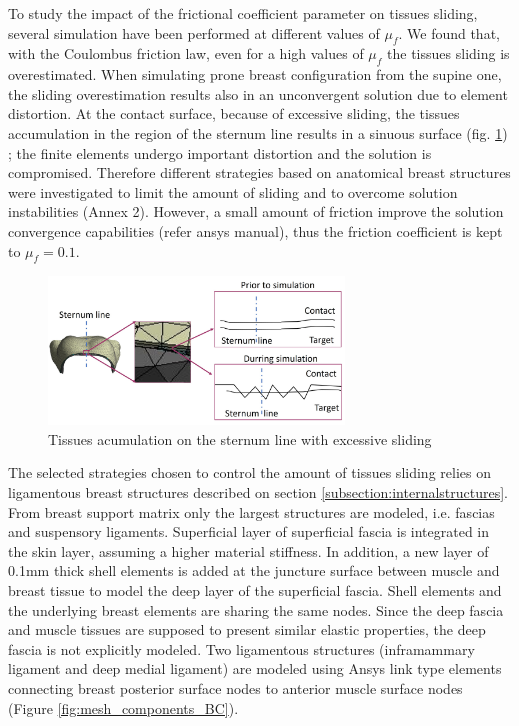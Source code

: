 To study the impact of the frictional coefficient parameter on tissues sliding, several simulation have been performed at different values of $\mu_f$. We found that, with the Coulombus friction law, even for a high values of $\mu_f$ the tissues sliding is overestimated. When simulating prone breast configuration from the supine one, the sliding overestimation results also in an unconvergent solution due to element distortion. At the contact surface, because of excessive sliding, the tissues accumulation in the region of the sternum line results in a sinuous surface  (fig. \ref{fig:overslidingProblem}) ; the finite elements  undergo important distortion and the solution is compromised. Therefore different strategies based on anatomical breast structures were investigated to limit the amount of sliding and to overcome solution instabilities (Annex 2). However, a small amount of friction improve the solution convergence capabilities (refer ansys manual), thus the friction coefficient is kept to $\mu_f = 0.1$. 
\begin{figure}[!h]
\centering
\includegraphics[width=0.7\textwidth,keepaspectratio]{figures/overslidingProblem.jpg} 
\caption{Tissues acumulation on the sternum line with excessive sliding}\label{fig:overslidingProblem}
\end{figure}
 
The selected  strategies chosen to control the amount of tissues sliding relies on ligamentous breast structures described on section \ref{subsection:internalstructures}. From breast support matrix only the largest structures are modeled, i.e. fascias and suspensory ligaments.  Superficial layer of superficial fascia is integrated in the skin layer, assuming a higher material stiffness. In addition, a new layer of 0.1mm thick shell elements is added at the juncture surface between muscle and breast tissue to model the deep layer of the superficial fascia. Shell elements and the underlying breast elements are sharing the same nodes. Since the deep fascia and muscle tissues are supposed to present similar elastic properties, the deep fascia is not explicitly modeled. Two ligamentous structures (inframammary ligament and deep medial ligament) are modeled using Ansys link type elements connecting breast posterior surface nodes to anterior muscle surface nodes (Figure \ref{fig:mesh_components_BC}).  


